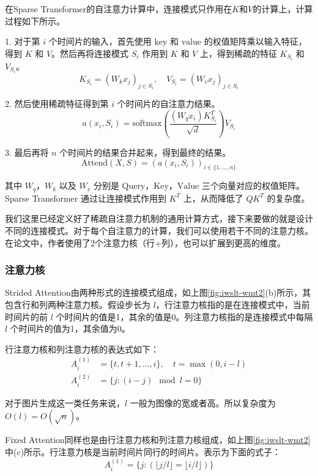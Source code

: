 在Sparse Transformer的自注意力计算中，连接模式只作用在$K$和$V$的计算上，计算过程如下所示。

1. 对于第 \(i\) 个时间片的输入，首先使用 \( \text{key} \) 和 \( \text{value} \) 的权值矩阵乘以输入特征，得到 \( K \) 和 \( V \)。然后再将连接模式 \( S_i \) 作用到 \( K \) 和 \( V \) 上，得到稀疏的特征 \( K_{S_i} \) 和 \( V_{S_i} \)。
   \[
   K_{S_i} = (W_k x_j)_{j \in S_i}, \quad V_{S_i} = (W_v x_j)_{j \in S_i}
   \]

2. 然后使用稀疏特征得到第 \(i\) 个时间片的自注意力结果。
   \[
   a(x_i, S_i) = \text{softmax}\left(\frac{(W_q x_i) K_{S_i}^T}{\sqrt{d}}\right) V_{S_i}
   \]

3. 最后再将 \(n\) 个时间片的结果合并起来，得到最终的结果。
   \[
   \text{Attend}(X, S) = (a(x_i, S_i))_{i \in \{1, \ldots, n\}}
   \]

其中 \( W_q \)，\( W_k \) 以及 \( W_v \) 分别是 \( \text{Query} \)，\( \text{Key} \)，\( \text{Value} \) 三个向量对应的权值矩阵。Sparse Transformer 通过让连接模式作用到 \( K^T \) 上，从而降低了 \( QK^T \) 的复杂度。

我们这里已经定义好了稀疏自注意力机制的通用计算方式，接下来要做的就是设计不同的连接模式。对于每个自注意力的计算，我们可以使用若干不同的注意力核。在论文中，作者使用了2个注意力核（行+列），也可以扩展到更高的维度。

\subsubsection{注意力核}

Strided Attention由两种形式的连接模式组成，如上图\ref{fig:iwslt-wmt2}(b)所示，其包含行和列两种注意力核。假设步长为 \( l \)，行注意力核指的是在连接模式中，当前时间片的前 \( l \) 个时间片的值是1，其余的值是0。列注意力核指的是连接模式中每隔 \( l \) 个时间片的值为1，其余值为0。

行注意力核和列注意力核的表达式如下：
\begin{align*}
A_i^{(1)} &= \{t, t+1, \ldots, i\}, \quad t = \max(0, i-l) \\
A_i^{(2)} &= \{j: (i-j) \mod l = 0\}
\end{align*}

对于图片生成这一类任务来说，\( l \) 一般为图像的宽或者高。所以复杂度为 \( O(l) = O(\sqrt{n}) \)。

Fixed Attention同样也是由行注意力核和列注意力核组成，如上图\ref{fig:iwslt-wmt2}中(c)所示。行注意力核是当前时间片同行的时间片。表示为下面的式子：
\[
A_i^{(1)} = \{j: (\lfloor j/ l \rfloor = \lfloor i/ l \rfloor)\}
\]

